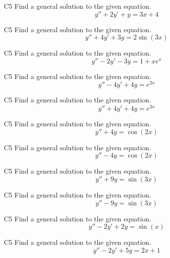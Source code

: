 \begin{problem}{C5}
Find a general solution to the given equation.
\[
y'' + 2y' + y = 3x + 4
\]
\end{problem}


\begin{problem}{C5}
Find a general solution to the given equation.
\[
y'' + 4y' + 3y = 2\sin(3x)
\]
\end{problem}


\begin{problem}{C5}
Find a general solution to the given equation.
\[
y'' - 2y' - 3y = 1 + xe^x
\]
\end{problem}


\begin{problem}{C5}
Find a general solution to the given equation.
\[
y'' - 4y' + 4y = e^{2x}
\]
\end{problem}

\begin{problem}{C5}
Find a general solution to the given equation.
\[
y'' + 4y' + 4y = e^{2x}
\]
\end{problem}




\begin{problem}{C5}
Find a general solution to the given equation.
\[
y'' + 4y = \cos(2x)
\]
\end{problem}

\begin{problem}{C5}
Find a general solution to the given equation.
\[
y'' - 4y = \cos(2x)
\]
\end{problem}


\begin{problem}{C5}
Find a general solution to the given equation.
\[
y'' + 9y = \sin(3x)
\]
\end{problem}

\begin{problem}{C5}
Find a general solution to the given equation.
\[
y'' - 9y = \sin(3x)
\]
\end{problem}


\begin{problem}{C5}
Find a general solution to the given equation.
\[
y'' - 2y' + 2y = \sin(x)
\]
\end{problem}


\begin{problem}{C5}
Find a general solution to the given equation.
\[
y'' - 2y' + 5y = 2x + 1
\]
\end{problem}



